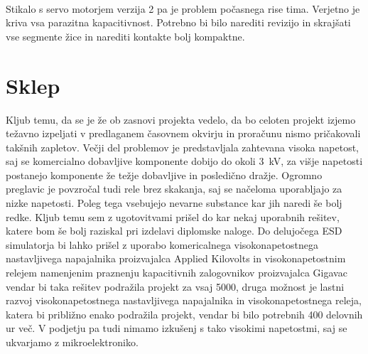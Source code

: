 \documentclass[a4paper,twoside,openright,12pt,slovene]{book}
\begin{document}
    ~\\Stikalo s servo motorjem verzija 2 pa je problem počasnega rise tima. Verjetno je kriva vsa parazitna kapacitivnost. Potrebno bi bilo narediti revizijo in skrajšati vse segmente žice in narediti kontakte bolj kompaktne. 
    





\chapter{Sklep} \label{Sklep}

	Kljub temu, da se je že ob zasnovi projekta vedelo, da bo celoten projekt izjemo težavno izpeljati v predlaganem časovnem okvirju in proračunu nismo pričakovali takšnih zapletov. Večji del problemov je predstavljala zahtevana visoka napetost, saj se komercialno dobavljive komponente dobijo do okoli \SI{3}{\kilo\volt}, za višje napetosti postanejo komponente že težje dobavljive in posledično dražje. Ogromno preglavic je povzročal tudi rele brez skakanja, saj se načeloma uporabljajo za nizke napetosti. Poleg tega vsebujejo nevarne substance kar jih naredi še bolj redke. Kljub temu sem z ugotovitvami prišel do kar nekaj uporabnih rešitev, katere bom še bolj raziskal pri izdelavi diplomske naloge. Do delujočega ESD simulatorja bi lahko prišel z uporabo komericalnega visokonapetostnega nastavljivega napajalnika proizvajalca Applied Kilovolts in visokonapetostnim relejem namenjenim praznenju kapacitivnih zalogovnikov proizvajalca Gigavac vendar bi taka rešitev podražila projekt za vsaj 5000\texteuro , druga možnost je lastni razvoj visokonapetostnega nastavljivega napajalnika in visokonapetostnega releja, katera bi približno enako podražila projekt, vendar bi bilo potrebnih 400 delovnih ur več. V podjetju pa tudi nimamo izkušenj s tako visokimi napetostmi, saj se ukvarjamo z mikroelektroniko.
	
	
	
	
 
\end{document}
